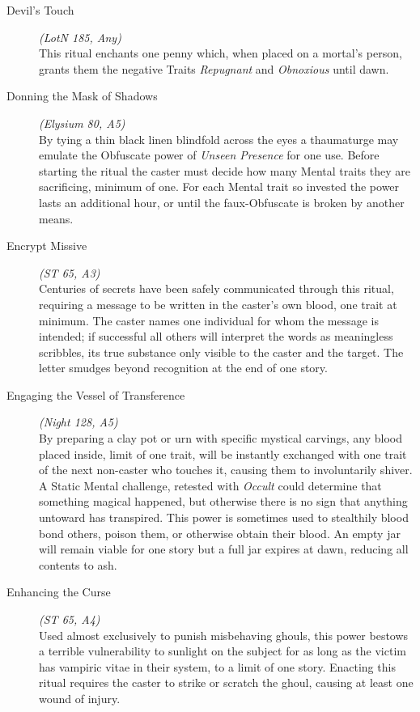 \begin{description}
	\item[Devil's Touch] \emph{(LotN 185, Any)} \hfill \\
	This ritual enchants one penny which, when placed on a mortal's person, grants them the negative Traits 
	\emph{Repugnant} and \emph{Obnoxious} until dawn. \\
	
	\item[Donning the Mask of Shadows] \emph{(Elysium 80, A5)} \hfill \\
	By tying a thin black linen blindfold across the eyes a thaumaturge may emulate the Obfuscate power of 
	\emph{Unseen Presence} for one use.  Before starting the ritual the caster must decide how many Mental traits they 
	are sacrificing, minimum of one.  For each Mental trait so invested the power lasts an additional hour, or until 
	the faux-Obfuscate is broken by another means. \\
	
	\item[Encrypt Missive] \emph{(ST 65, A3)} \hfill \\
	Centuries of secrets have been safely communicated through this ritual, requiring a message to be written in the 
	caster's own blood, one trait at minimum.  The caster names one individual for whom the message is intended; if 
	successful all others will interpret the words as meaningless scribbles, its true substance only visible to the 
	caster and the target.  The letter smudges beyond recognition at the end of one story. \\
	
	\item[Engaging the Vessel of Transference] \emph{(Night 128, A5)} \hfill \\
	By preparing a clay pot or urn with specific mystical carvings, any blood placed inside, limit of one trait, will 
	be instantly exchanged with one trait of the next non-caster who touches it, causing them to involuntarily shiver.  
	A Static Mental challenge, retested with \emph{Occult} could determine that something magical happened, but 
	otherwise there is no sign that anything untoward has transpired. This power is sometimes used to stealthily blood 
	bond others, poison them, or otherwise obtain their blood. An empty jar will remain viable for one story but a full 
	jar expires at dawn, reducing all contents to ash. \\
	
	\item[Enhancing the Curse] \emph{(ST 65, A4)} \hfill \\
	Used almost exclusively to punish misbehaving ghouls, this power bestows a terrible vulnerability to sunlight on the 
	subject for as long as the victim has vampiric vitae in their system, to a limit of one story.  Enacting this ritual 
	requires the caster to strike or scratch the ghoul, causing at least one wound of injury. \\
	

\end{description}
